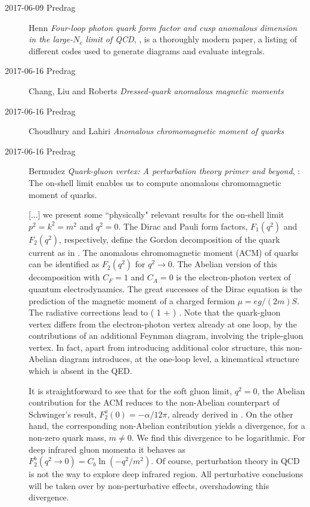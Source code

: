 \begin{description}
%
%
%
%
%
%
%

\item[2017-06-09 Predrag]
Henn \etal{}
{\em Four-loop photon quark form factor and cusp anomalous dimension in
the large-{$N_c$} limit of {QCD}}, , is a thoroughly
modern paper, a listing of different codes used to generate diagrams and
evaluate integrals.

\item[2017-06-16 Predrag]
Chang, Liu and Roberts
{\em Dressed-quark anomalous magnetic moments}

\item[2017-06-16 Predrag]
Choudhury and Lahiri
{\em Anomalous chromomagnetic moment of quarks}

\item[2017-06-16 Predrag]
Bermudez \etal{}
{\em Quark-gluon vertex: {A} perturbation theory primer and beyond},
:
The on-shell limit enables us to compute anomalous chromomagnetic moment
of quarks.

[...] we present some ``physically" relevant results for
the on-shell limit $p^2=k^2=m^2$ and $q^2=0$. The Dirac and Pauli
form factors, $F_1(q^2)$ and $F_2(q^2)$, respectively, define the
Gordon decomposition of the quark current as in .
The anomalous chromomagnetic moment (ACM) of quarks can be
identified as $F_2(q^2)$ for $q^2 \rightarrow 0$. The Abelian
version of this decomposition with $C_F=1$ and $C_A=0$ is the
electron-photon vertex of quantum electrodynamics. The great
successes of the Dirac equation is the prediction of the magnetic
moment of a charged fermion  ${ {\mu}} = {eg}/{(2 m)} { S}$.
The radiative corrections lead to
 \bea
  \Rightarrow \left( 1 + \frac{\alpha}{2 \pi} \right) .
 \eea
Note that the quark-gluon vertex differs from the electron-photon vertex
already at one loop, by the contributions of an additional Feynman
diagram, involving the triple-gluon vertex. In fact, apart from
introducing additional color structure, this non-Abelian diagram
introduces, at the one-loop level, a kinematical structure which is
absent in the QED.

It is straightforward to see that for the soft gluon limit, $q^2=0$, the
Abelian contribution for the ACM reduces to the non-Abelian counterpart
of Schwinger's result, $F_{2}^{a}(0) = - \alpha /12 \pi$, already derived
in . On the other hand, the corresponding non-Abelian
contribution yields a divergence, for a non-zero quark mass,
$m \neq 0$. We find this divergence to be logarithmic. For deep infrared
gluon momenta it behaves as $F_2^{b}(q^2 \rightarrow 0)= C_b \ln \left( -
q^2/m^2 \right)$. Of course, perturbation theory in QCD is not the way to
explore deep infrared region. All perturbative conclusions will be taken
over by non-perturbative effects, overshadowing this divergence.


\end{description}
